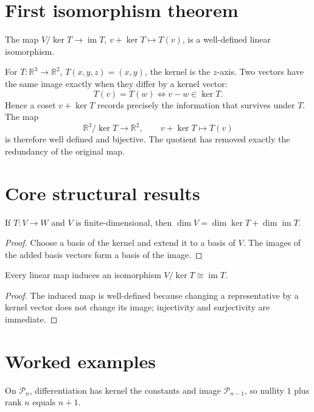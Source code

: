 \section{First isomorphism theorem}
The map $V/\ker T\to\operatorname{im}T$, $v+\ker T\mapsto T(v)$, is a well-defined linear isomorphism.


\begin{example}\label{ex:i06-expand-03}
For \(T:\mathbb R^3\to\mathbb R^2\),
\(T(x,y,z)=(x,y)\), the kernel is the \(z\)-axis. Two vectors have the same
image exactly when they differ by a kernel vector:
\[
T(v)=T(w)\iff v-w\in\ker T.
\]
Hence a coset \(v+\ker T\) records precisely the information that survives
under \(T\). The map
\[
\mathbb R^3/\ker T\longrightarrow\mathbb R^2,\qquad
v+\ker T\mapsto T(v)
\]
is therefore well defined and bijective. The quotient has removed exactly the
redundancy of the original map.
\end{example}
\section{Core structural results}

\begin{theorem}\label{thm:i06-01}
If $T:V\to W$ and $V$ is finite-dimensional, then $\dim V=\dim\ker T+\dim\operatorname{im}T$.
\begin{proof}
Choose a basis of the kernel and extend it to a basis of $V$. The images of the added basis vectors form a basis of the image.
\end{proof}
\end{theorem}

\begin{theorem}\label{thm:i06-02}
Every linear map induces an isomorphism $V/\ker T\cong\operatorname{im}T$.
\begin{proof}
The induced map is well-defined because changing a representative by a kernel vector does not change its image; injectivity and surjectivity are immediate.
\end{proof}
\end{theorem}

\section{Worked examples}

\begin{example}[Differentiation]\label{ex:i06-worked-01}
On $\mathcal P_n$, differentiation has kernel the constants and image $\mathcal P_{n-1}$, so nullity $1$ plus rank $n$ equals $n+1$.
\end{example}

